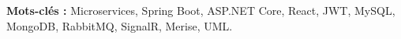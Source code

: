 \documentclass[12pt,a4paper]{report}
\begin{document}
\vspace{0.5cm}
\noindent\textbf{Mots-clés :} Microservices, Spring Boot, ASP.NET Core, React, JWT, MySQL, MongoDB,
RabbitMQ, SignalR, Merise, UML.

\tableofcontents
\newpage







\end{document}
